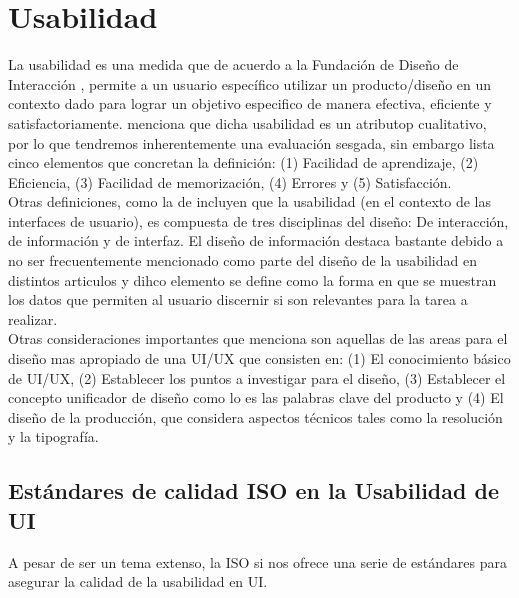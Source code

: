 \section{Usabilidad}
La usabilidad es una medida que de acuerdo a la Fundación de Diseño de Interacción \cite{unknown-author-no-dateC}, %
permite a un usuario específico utilizar un producto/diseño en un contexto dado para lograr
un objetivo especifico de manera efectiva, eficiente y satisfactoriamente. \cite{unknown-author-no-dateB} menciona %
que dicha usabilidad es un atributop cualitativo, por lo que tendremos inherentemente una
evaluación sesgada, sin embargo lista cinco elementos que concretan la definición:
(1) Facilidad de aprendizaje, (2) Eficiencia, (3) Facilidad de memorización, (4) Errores 
y (5) Satisfacción.
\\

Otras definiciones, como la de \cite{guntupalli-no-date} %
incluyen que la usabilidad (en el contexto de las interfaces de usuario),
es compuesta de tres disciplinas del diseño: De interacción, de información y de 
interfaz. El diseño de información destaca bastante debido a no ser frecuentemente mencionado como 
parte del diseño de la usabilidad en distintos articulos y dihco elemento se define como la forma en 
que se muestran los datos que permiten al usuario discernir si son relevantes para la tarea a realizar.
\\

Otras consideraciones importantes que \cite{joo-2017}  %
menciona son aquellas de las areas para el diseño mas apropiado de una UI/UX que consisten en:
(1) El conocimiento básico de UI/UX, (2) Establecer los puntos a investigar para el diseño,
(3) Establecer el concepto unificador de diseño como lo es las palabras clave del producto y
(4) El diseño de la producción, que considera aspectos técnicos tales como la resolución y la tipografía.

\subsection{Estándares de calidad ISO en la Usabilidad de UI}
A pesar de ser un tema extenso, la ISO si nos ofrece una serie de estándares para asegurar
la calidad de la usabilidad en UI. 

